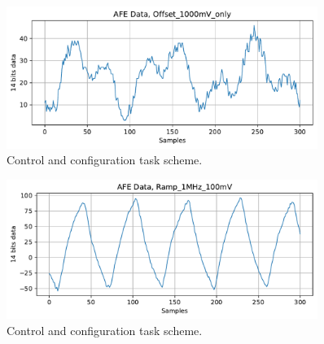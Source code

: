 \begin{figure}[htbp]
\centering %
\includegraphics[width=0.9\textwidth,origin=c,angle=0]{Images/DaphneAFETest/Offset_1000mV_only.pdf}
\caption{\label{fig:InitPeriTask} Control and configuration task scheme.}
\end{figure}


\begin{figure}[htbp]
\centering %
\includegraphics[width=0.9\textwidth,origin=c,angle=0]{Images/DaphneAFETest/Ramp_1MHz_100mV.pdf}
\caption{\label{fig:InitPeriTask} Control and configuration task scheme.}
\end{figure}

